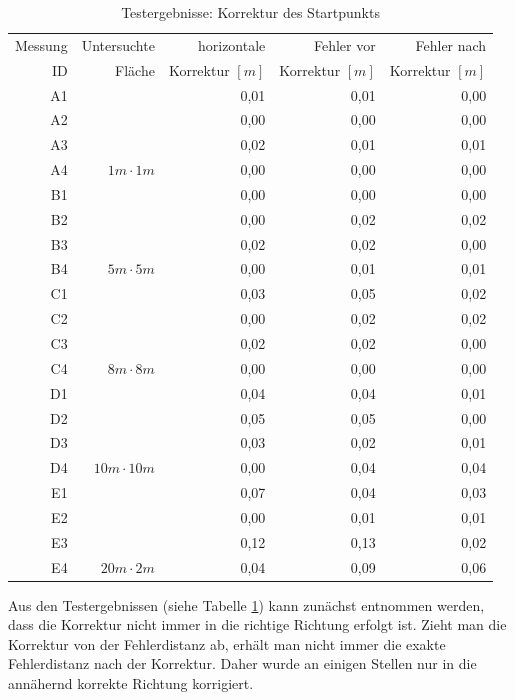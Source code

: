 \documentclass[10pt]{scrartcl}
\begin{document}
\begin{table}
\centering
\begin{tabular}{|r|r|r|r|r|}
\hline
Messung & Untersuchte & horizontale & Fehler vor & Fehler nach \\
ID & Fläche & Korrektur $[m]$ & Korrektur $[m]$ & Korrektur $[m]$ \\\hline

A1 & & 0,01 & 0,01 & 0,00 \\
A2 & & 0,00 & 0,00 & 0,00 \\
A3 & & 0,02 & 0,01 & 0,01 \\
A4 & $1m \cdot 1m$ & 0,00 & 0,00 & 0,00 \\\hline

B1 & & 0,00 & 0,00 & 0,00 \\
B2 & & 0,00 & 0,02 & 0,02 \\
B3 & & 0,02 & 0,02 & 0,00 \\
B4 & $5m \cdot 5m$ & 0,00 & 0,01 & 0,01 \\\hline

C1 & & 0,03 & 0,05 & 0,02 \\
C2 & & 0,00 & 0,02 & 0,02 \\
C3 & & 0,02 & 0,02 & 0,00 \\
C4 & $8m \cdot 8m$ & 0,00 & 0,00 & 0,00 \\\hline

D1 & & 0,04 & 0,04 & 0,01 \\
D2 & & 0,05 & 0,05 & 0,00 \\
D3 & & 0,03 & 0,02 & 0,01 \\
D4 & $10m \cdot 10m$ & 0,00 & 0,04 & 0,04 \\\hline

E1 & & 0,07 & 0,04 & 0,03 \\
E2 & & 0,00 & 0,01 & 0,01 \\
E3 & & 0,12 & 0,13 & 0,02 \\
E4 & $20m \cdot 2m$ & 0,04 & 0,09 & 0,06 \\\hline

\end{tabular}
\caption{\label{tab:araccuracy2}Testergebnisse: Korrektur des Startpunkts}
\end{table}

Aus den Testergebnissen (siehe Tabelle \ref{tab:araccuracy2}) kann zunächst entnommen werden, dass die Korrektur nicht immer in die richtige Richtung erfolgt ist. Zieht man die Korrektur von der Fehlerdistanz ab, erhält man nicht immer die exakte Fehlerdistanz nach der Korrektur. Daher wurde an einigen Stellen nur in die annähernd korrekte Richtung korrigiert.
\end{document}
